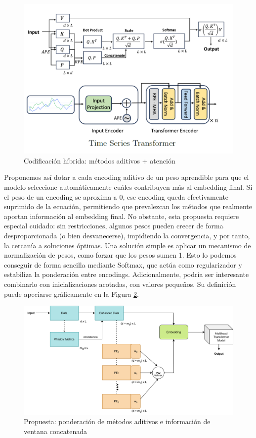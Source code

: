 \begin{figure}[!ht]
	\centering
	\includegraphics[scale=0.35]{img/hybridpaper.png}
	\caption{Codificación híbrida: métodos aditivos + atención \cite{irani2025positionalencodingtransformerbasedtime}}
	\label{hybridpaper}
\end{figure}


Proponemos así dotar a cada encoding aditivo de un peso aprendible para que el modelo seleccione automáticamente cuáles contribuyen más al embedding final. Si el peso de un encoding se aproxima a 0, ese encoding queda efectivamente suprimido de la ecuación, permitiendo que prevalezcan los métodos que realmente aportan información al embedding final. No obstante, esta propuesta requiere especial cuidado: sin restricciones, algunos pesos pueden crecer de forma desproporcionada (o bien desvanecerse), impidiendo la convergencia, y por tanto, la cercanía a soluciones óptimas. Una solución simple es aplicar un mecanismo de normalización de pesos, como forzar que los pesos sumen 1. Esto lo podemos conseguir de forma sencilla mediante Softmax, que actúa como regularizador y estabiliza la ponderación entre encodings. Adicionalmente, podría ser interesante combinarlo con inicializaciones acotadas, con valores pequeños. Su definición puede apeciarse gráficamente en la Figura \ref{enhancedhybrid}.\\

\begin{figure}[!ht]
	\centering
	\includegraphics[scale=0.6]{img/enhancedhybrid.png}
	\caption{Propuesta: ponderación de métodos aditivos e información de ventana concatenada}
	\label{enhancedhybrid}
\end{figure}

